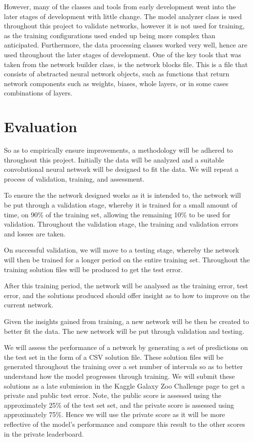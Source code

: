 \documentclass[12pt,a4paper,oneside,oldfontcommands]{memoir}
\begin{document}
\begin{Declaration Of OriginalityOrginality}
However, many of the classes and tools from early development went into the later stages of development with little change. The model analyzer class is used throughout this project to validate networks, however it is not used for training, as the training configurations used ended up being more complex than anticipated. Furthermore, the data processing classes worked very well, hence are used throughout the later stages of development. One of the key tools that was taken from the network builder class, is the network blocks file. This is a file that consists of abstracted neural network objects, such as functions that return network components such as weights, biases, whole layers, or in some cases combinations of layers.

\section{Evaluation}

So as to empirically ensure improvements, a methodology will be adhered to throughout this project. Initially the data will be analyzed and a suitable convolutional neural network will be designed to fit the data. We will repeat a process of validation, training, and assessment.

To ensure the the network designed works as it is intended to, the network will be put through a validation stage, whereby it is trained for a small amount of time, on 90\% of the training set, allowing the remaining 10\% to be used for validation. Throughout the validation stage, the training and validation errors and losses are taken. 

On successful validation, we will move to a testing stage, whereby the network will then be trained for a longer period on the entire training set. Throughout the training solution files will be produced to get the test error.

After this training period, the network will be analysed as the training error, test error, and the solutions produced should offer insight as to how to improve on the current network.

Given the insights gained from training, a new network will be then be created to better fit the data. The new network will be put through validation and testing. 

We will assess the performance of a network by generating a set of predictions on the test set in the form of a CSV solution file. These solution files will be generated throughout the training over a set number of intervals so as to better understand how the model progresses through training. We will submit these solutions as a late submission in the Kaggle Galaxy Zoo Challenge page to get a private and public test error. Note, the public score is assessed using the approximately 25\% of the test set set, and the private score is assessed using approximately 75\%. Hence we will use the private score as it will be more reflective of the model's performance and compare this result to the other scores in the private leaderboard. 


\end{Declaration Of OriginalityOrginality}
\end{document}
